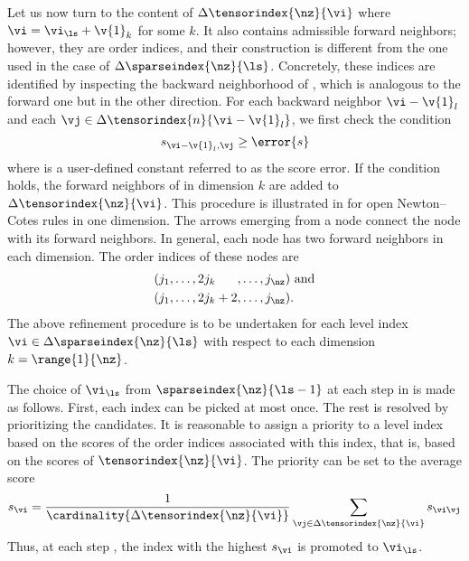 Let us now turn to the content of $\Delta\tensorindex{\nz}{\vi}$ where $\vi =
\vi_{\ls} + \v{1}_k$ for some $k$. It also contains admissible forward
neighbors; however, they are order indices, and their construction is different
from the one used in the case of $\Delta\sparseindex{\nz}{\ls}$. Concretely,
these indices are identified by inspecting the backward neighborhood of \vi,
which is analogous to the forward one but in the other direction. For each
backward neighbor $\vi - \v{1}_l$ and each $\vj \in \Delta\tensorindex{n}{\vi -
\v{1}_l}$, we first check the condition
\[
  s_{\vi - \v{1}_l, \vj} \geq \error{s}
\]
where  is a user-defined constant referred to as the score error. If
the condition holds, the forward neighbors of \vj in dimension $k$ are added to
$\Delta\tensorindex{\nz}{\vi}$. This procedure is illustrated in
 for open Newton--Cotes rules in one dimension. The arrows
emerging from a node connect the node with its forward neighbors. In general,
each node has two forward neighbors in each dimension. The order indices of
these nodes are
\begin{align*}
  & (j_1, \dots, 2 j_k \phantom{{} + 2}, \dots, j_{\nz}) \text{ and} \\
  & (j_1, \dots, 2 j_k + 2,              \dots, j_{\nz}).
\end{align*}
The above refinement procedure is to be undertaken for each level index $\vi \in
\Delta\sparseindex{\nz}{\ls}$ with respect to each dimension $k =
\range{1}{\nz}$.

The choice of $\vi_{\ls}$ from $\sparseindex{\nz}{\ls - 1}$ at each step \ls in
 is made as follows. First, each index can be picked at most
once. The rest is resolved by prioritizing the candidates. It is reasonable to
assign a priority to a level index \vi based on the scores of the order indices
associated with this index, that is, based on the scores of
$\tensorindex{\nz}{\vi}$. The priority can be set to the average score
\[
  s_{\vi} = \frac{1}{\cardinality{\Delta\tensorindex{\nz}{\vi}}} \sum_{\vj \in \Delta\tensorindex{\nz}{\vi}} s_{\vi \vj}
\]
Thus, at each step \ls, the index \vi with the highest $s_{\vi}$ is promoted to
$\vi_{\ls}$.

